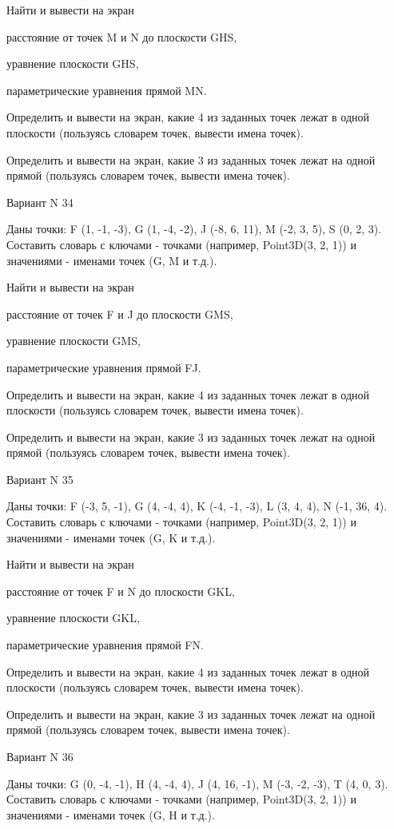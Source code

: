 \documentclass[11pt]{report}
\begin{document}
 
Найти и вывести на экран


расстояние от точек M и N до плоскости GHS,

 
уравнение плоскости GHS,

 
параметрические уравнения прямой MN.


Определить и вывести на экран, какие 4 из заданных точек лежат в одной плоскости (пользуясь словарем точек, вывести имена точек).


Определить и вывести на экран, какие 3 из заданных точек лежат на одной прямой (пользуясь словарем точек, вывести имена точек).

Вариант N 34

Даны точки: F (1, -1, -3), G (1, -4, -2), J (-8, 6, 11), M (-2, 3, 5), S (0, 2, 3).
Составить словарь с ключами - точками (например, Point3D(3, 2, 1)) и значениями - именами точек (G, M и т.д.).

 
Найти и вывести на экран


расстояние от точек F и J до плоскости GMS,

 
уравнение плоскости GMS,

 
параметрические уравнения прямой FJ.


Определить и вывести на экран, какие 4 из заданных точек лежат в одной плоскости (пользуясь словарем точек, вывести имена точек).


Определить и вывести на экран, какие 3 из заданных точек лежат на одной прямой (пользуясь словарем точек, вывести имена точек).

Вариант N 35

Даны точки: F (-3, 5, -1), G (4, -4, 4), K (-4, -1, -3), L (3, 4, 4), N (-1, 36, 4).
Составить словарь с ключами - точками (например, Point3D(3, 2, 1)) и значениями - именами точек (G, K и т.д.).

 
Найти и вывести на экран


расстояние от точек F и N до плоскости GKL,

 
уравнение плоскости GKL,

 
параметрические уравнения прямой FN.


Определить и вывести на экран, какие 4 из заданных точек лежат в одной плоскости (пользуясь словарем точек, вывести имена точек).


Определить и вывести на экран, какие 3 из заданных точек лежат на одной прямой (пользуясь словарем точек, вывести имена точек).

Вариант N 36

Даны точки: G (0, -4, -1), H (4, -4, 4), J (4, 16, -1), M (-3, -2, -3), T (4, 0, 3).
Составить словарь с ключами - точками (например, Point3D(3, 2, 1)) и значениями - именами точек (G, H и т.д.).
\end{document}
